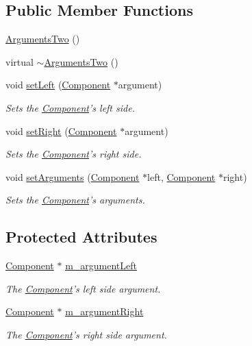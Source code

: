 \subsection*{Public Member Functions}
\begin{DoxyCompactItemize}
\item 
\hyperlink{classkissms_1_1_arguments_two_a8da02300ecb9eb1a6fc10dab83badd10}{Arguments\-Two} ()
\item 
virtual \hyperlink{classkissms_1_1_arguments_two_ab7ee206cc5dbd908336214030e7ff920}{$\sim$\-Arguments\-Two} ()
\item 
void \hyperlink{classkissms_1_1_arguments_two_a4abc6f6bca274e317a7d3b74c20e6e7c}{set\-Left} (\hyperlink{classkissms_1_1_component}{Component} $\ast$argument)
\begin{DoxyCompactList}\small\item\em Sets the \hyperlink{classkissms_1_1_component}{Component}'s left side. \end{DoxyCompactList}\item 
void \hyperlink{classkissms_1_1_arguments_two_a91446cdcdd8e907693c7e15f5f753e73}{set\-Right} (\hyperlink{classkissms_1_1_component}{Component} $\ast$argument)
\begin{DoxyCompactList}\small\item\em Sets the \hyperlink{classkissms_1_1_component}{Component}'s right side. \end{DoxyCompactList}\item 
void \hyperlink{classkissms_1_1_arguments_two_ac0e32475b1be1f5912da9af37346654e}{set\-Arguments} (\hyperlink{classkissms_1_1_component}{Component} $\ast$left, \hyperlink{classkissms_1_1_component}{Component} $\ast$right)
\begin{DoxyCompactList}\small\item\em Sets the \hyperlink{classkissms_1_1_component}{Component}'s arguments. \end{DoxyCompactList}\end{DoxyCompactItemize}
\subsection*{Protected Attributes}
\begin{DoxyCompactItemize}
\item 
\hyperlink{classkissms_1_1_component}{Component} $\ast$ \hyperlink{classkissms_1_1_arguments_two_a9c99ed4842c86cca7daec68e6184eefc}{m\-\_\-argument\-Left}
\begin{DoxyCompactList}\small\item\em The \hyperlink{classkissms_1_1_component}{Component}'s left side argument. \end{DoxyCompactList}\item 
\hyperlink{classkissms_1_1_component}{Component} $\ast$ \hyperlink{classkissms_1_1_arguments_two_a6c3c75623ef11c44443dc37b6574247e}{m\-\_\-argument\-Right}
\begin{DoxyCompactList}\small\item\em The \hyperlink{classkissms_1_1_component}{Component}'s right side argument. \end{DoxyCompactList}\end{DoxyCompactItemize}


